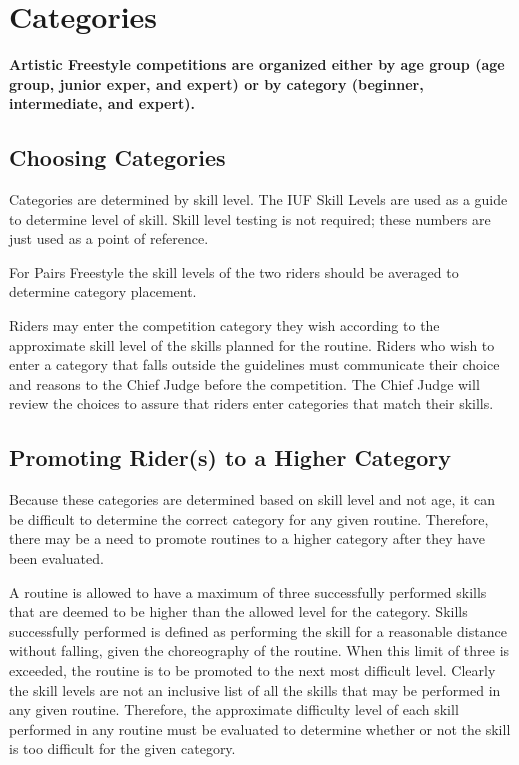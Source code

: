\section{Categories}

\textbf{Artistic Freestyle competitions are organized either by age group (age group, junior exper, and expert) or by category (beginner, intermediate, and expert).}

\subsection{Choosing Categories}
Categories are determined by skill level.
The IUF Skill Levels are used as a guide to determine level of skill.
Skill level testing is not required; these numbers are just used as a point of reference.

For Pairs Freestyle the skill levels of the two riders should be averaged to determine category placement.

Riders may enter the competition category they wish according to the approximate skill
level of the skills planned for the routine.
Riders who wish to enter a category that falls outside the guidelines must communicate their choice and reasons to the Chief Judge before the competition.
The Chief Judge will review the choices to assure that riders enter categories that match their skills.

\subsection{Promoting Rider(s) to a Higher Category}
Because these categories are determined based on skill level and not age, it can be difficult to determine the correct category for any given routine.
Therefore, there may be a need to promote routines to a higher category after they have been evaluated.

A routine is allowed to have a maximum of three successfully performed skills that are deemed to be higher than the allowed level for the category.
Skills successfully performed is defined as performing the skill for a reasonable distance without falling, given the choreography of the routine.
When this limit of three is exceeded, the routine is to be promoted to the next most difficult level.
Clearly the skill levels are not an inclusive list of all the skills that may be performed in any given routine.
Therefore, the approximate difficulty level of each skill performed in any routine must be evaluated to determine whether or not the skill is too difficult for the given category.

